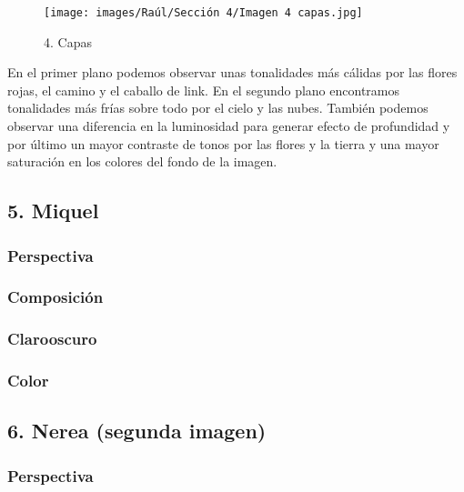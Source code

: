 \documentclass[12pt]{article}
\begin{document}
\begin{figure}[H]
      \centering
      \texttt{[image: images/Raúl/Sección 4/Imagen 4 capas.jpg]}
      \caption{\small 4. Capas}
\end{figure}

 En el primer plano podemos observar unas tonalidades más cálidas por las flores rojas, el camino y el caballo de link. En el segundo plano encontramos tonalidades más frías sobre todo por el cielo y las nubes. También podemos observar una diferencia en la luminosidad para generar efecto de profundidad y por último un mayor contraste de tonos por las flores y la tierra y una mayor saturación en los colores del fondo de la imagen.


        \newpage


    \subsection{5. Miquel}
        \subsubsection{Perspectiva}

        \subsubsection{Composición}

        \subsubsection{Clarooscuro}

        \subsubsection{Color}
        \newpage


    \subsection{6. Nerea (segunda imagen)}
        \subsubsection{Perspectiva}
\end{document}
